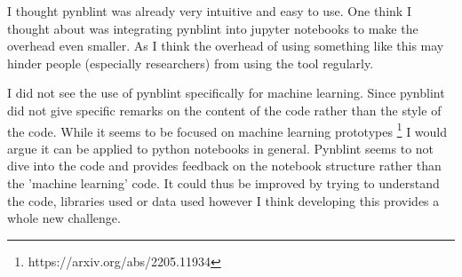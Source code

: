\documentclass[11pt]{article}
\begin{document}
I thought pynblint was already very intuitive and easy to use. One think I thought about was integrating pynblint into jupyter notebooks to make the overhead even smaller. As I think the overhead of using something like this may hinder people (especially researchers) from using the tool regularly.

I did not see the use of pynblint specifically for machine learning. Since pynblint did not give specific remarks on the content of the code rather than the style of the code. While it seems to be focused on machine learning prototypes \footnote{https://arxiv.org/abs/2205.11934} I would argue it can be applied to python notebooks in general. Pynblint seems to not dive into the code and provides feedback on the notebook structure rather than the 'machine learning' code. It could thus be improved by trying to understand the code, libraries used or data used however I think developing this provides a whole new challenge.

\end{document}
